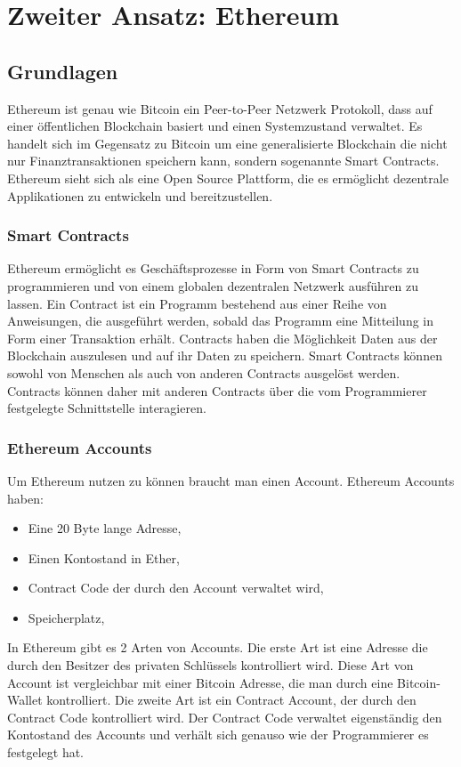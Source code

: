 \chapter{Zweiter Ansatz: Ethereum} %

\label{eth} %

\section{Grundlagen}
Ethereum ist genau wie Bitcoin ein Peer-to-Peer Netzwerk Protokoll, dass auf einer öffentlichen Blockchain basiert und einen Systemzustand verwaltet. Es handelt sich im Gegensatz zu Bitcoin um eine generalisierte Blockchain die nicht nur Finanztransaktionen speichern kann, sondern sogenannte Smart Contracts. Ethereum sieht sich als eine Open Source Plattform, die es ermöglicht dezentrale Applikationen zu entwickeln und bereitzustellen.

\subsection{Smart Contracts}
Ethereum ermöglicht es Geschäftsprozesse in Form von Smart Contracts zu programmieren und von einem globalen dezentralen Netzwerk ausführen zu lassen. Ein Contract ist ein Programm bestehend aus einer Reihe von Anweisungen, die ausgeführt werden, sobald das Programm eine Mitteilung in Form einer Transaktion erhält. Contracts haben die Möglichkeit Daten aus der Blockchain auszulesen und auf ihr Daten zu speichern. Smart Contracts können sowohl von Menschen als auch von anderen Contracts ausgelöst werden. Contracts können daher mit anderen Contracts über die vom Programmierer festgelegte Schnittstelle interagieren.
\subsection{Ethereum Accounts}
Um Ethereum nutzen zu können braucht man einen Account. Ethereum Accounts haben:\\
\begin{itemize}
\item Eine 20 Byte lange Adresse,
\item Einen Kontostand in Ether,
\item Contract Code der durch den Account verwaltet wird,
\item Speicherplatz,
\end{itemize} In Ethereum gibt es 2 Arten von Accounts. Die erste Art ist eine Adresse die durch den Besitzer des privaten Schlüssels kontrolliert wird. Diese Art von Account ist vergleichbar mit einer Bitcoin Adresse, die man durch eine Bitcoin-Wallet kontrolliert. Die zweite Art ist ein Contract Account, der durch den Contract Code kontrolliert wird. Der Contract Code verwaltet eigenständig den Kontostand des Accounts und verhält sich genauso wie der Programmierer es festgelegt hat.
